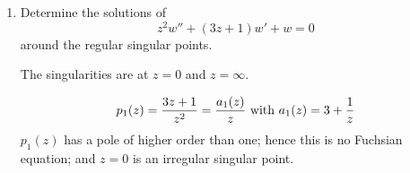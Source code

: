 {\begin{enumerate}
\bigskip

$$
   2z(z+2)w''+w'-zw=0\Longrightarrow w''+{1\over 2z(z+2)}w'-{1\over 2(z+2)}w=0
$$
 {$z=0$:}
$$
   \alpha_0=\lim_{z\to0}z{1\over 2z(z+2)}={1\over4},\quad
   \beta_0=\lim_{z\to0}z^2{-1\over 2(z+2)}=0.
$$
$$
   \Longrightarrow\sigma^2-\sigma+{1\over 4}\sigma=0\Longrightarrow
   \sigma^2-{3\over 4}\sigma=0\Longrightarrow\sigma_1=0,\sigma_2={3\over 4}.
$$
 {$z=-2$:}
$$
   \alpha_0=\lim_{z\to-2}(z+2){1\over 2z(z+2)}=-{1\over 4},\quad
   \beta_0=\lim_{z\to-2}(z+2)^2{-1\over 2(z+2)}=0.
$$
$$
   \Longrightarrow\sigma_1=0,\quad\sigma_2={5\over 4}.
$$
 {$z=\infty$:}
\begin{eqnarray*}
   \tilde p_1(t)&=&{2\over t}-{1\over t^2}\left({1\over 2{1\over t}
                   \left({1\over t}+2\right)}\right)={2\over t}-
                   {1\over 2(1+2t)}\\
   \tilde p_2(t)&=&{1\over t^4}{(-1)\over 2\left({1\over t}+2\right)}=
                   -{1\over 2t^3(1+2t)}
\end{eqnarray*}
$\Longrightarrow$ not a Fuchsian.


\item
Determine the solutions of
$$z^2w''+(3z+1)w'+w=0 $$  around the regular singular points.

The singularities are at $z=0$ and $z=\infty$.

$$
   p_1(z)={3z+1\over z^2}=
   {a_1(z)\over z} \textrm{ with }
   a_1(z)=3+{1\over z}
$$
  $p_1(z)$ has a pole of higher order than one; hence this is no Fuchsian equation;
and  $z=0$
is an irregular singular point.


\end{enumerate}}
